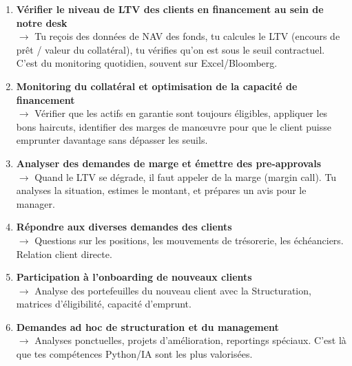 \documentclass[11pt,a4paper]{article}
\begin{document}
\begin{enumerate}[leftmargin=16pt]
\item \textbf{V\'erifier le niveau de LTV des clients en financement au sein de notre desk}\\
\textcolor{warmgray}{$\rightarrow$ Tu re\c{c}ois des donn\'ees de NAV des fonds, tu calcules le LTV
(encours de pr\^et / valeur du collat\'eral), tu v\'erifies qu'on est sous le seuil contractuel.
C'est du monitoring quotidien, souvent sur Excel/Bloomberg.}

\item \textbf{Monitoring du collat\'eral et optimisation de la capacit\'e de financement}\\
\textcolor{warmgray}{$\rightarrow$ V\'erifier que les actifs en garantie sont toujours \'eligibles,
appliquer les bons haircuts, identifier des marges de man\oe{}uvre pour que le client puisse
emprunter davantage sans d\'epasser les seuils.}

\item \textbf{Analyser des demandes de marge et \'emettre des pre-approvals}\\
\textcolor{warmgray}{$\rightarrow$ Quand le LTV se d\'egrade, il faut appeler de la marge (margin call).
Tu analyses la situation, estimes le montant, et pr\'epares un avis pour le manager.}

\item \textbf{R\'epondre aux diverses demandes des clients}\\
\textcolor{warmgray}{$\rightarrow$ Questions sur les positions, les mouvements de tr\'esorerie,
les \'ech\'eanciers. Relation client directe.}

\item \textbf{Participation \`a l'onboarding de nouveaux clients}\\
\textcolor{warmgray}{$\rightarrow$ Analyse des portefeuilles du nouveau client avec la Structuration,
matrices d'\'eligibilit\'e, capacit\'e d'emprunt.}

\item \textbf{Demandes ad hoc de structuration et du management}\\
\textcolor{warmgray}{$\rightarrow$ Analyses ponctuelles, projets d'am\'elioration, reportings sp\'eciaux.
C'est l\`a que tes comp\'etences Python/IA sont les plus valoris\'ees.}
\end{enumerate}

\vspace{8pt}

\end{document}

